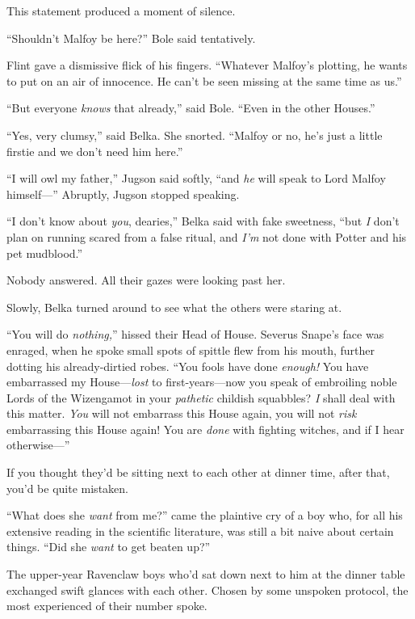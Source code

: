 This statement produced a moment of silence.

“Shouldn’t Malfoy be here?” Bole said tentatively.

Flint gave a dismissive flick of his fingers. “Whatever Malfoy’s plotting, he wants to put on an air of innocence. He can’t be seen missing at the same time as us.”

“But everyone \emph{knows} that already,” said Bole. “Even in the other Houses.”

“Yes, very clumsy,” said Belka. She snorted. “Malfoy or no, he’s just a little firstie and we don’t need him here.”

“I will owl my father,” Jugson said softly, “and \emph{he} will speak to Lord Malfoy himself—” Abruptly, Jugson stopped speaking.

“I don’t know about \emph{you}, dearies,” Belka said with fake sweetness, “but \emph{I} don’t plan on running scared from a false ritual, and \emph{I’m} not done with Potter and his pet mudblood.”

Nobody answered. All their gazes were looking past her.

Slowly, Belka turned around to see what the others were staring at.

“You will do \emph{nothing,}” hissed their Head of House. Severus Snape’s face was enraged, when he spoke small spots of spittle flew from his mouth, further dotting his already-dirtied robes. “You fools have done \emph{enough!} You have embarrassed my House—\emph{lost} to first-years—now you speak of embroiling noble Lords of the Wizengamot in your \emph{pathetic} childish squabbles? \emph{I} shall deal with this matter. \emph{You} will not embarrass this House again, you will not \emph{risk} embarrassing this House again! You are \emph{done} with fighting witches, and if I hear otherwise—”

\later

If you thought they’d be sitting next to each other at dinner time, after that, you’d be quite mistaken.

“What does she \emph{want} from me?” came the plaintive cry of a boy who, for all his extensive reading in the scientific literature, was still a bit naive about certain things. “Did she \emph{want} to get beaten up?”

The upper-year Ravenclaw boys who’d sat down next to him at the dinner table exchanged swift glances with each other. Chosen by some unspoken protocol, the most experienced of their number spoke.

